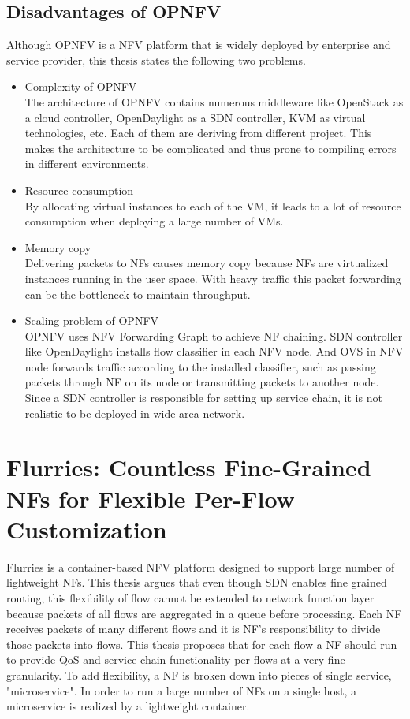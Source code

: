 \subsection{Disadvantages of OPNFV}
Although OPNFV is a NFV platform that is widely deployed by enterprise and service provider, this thesis states the following two problems.
\begin{itemize}
	\item Complexity of OPNFV \\
		The architecture of OPNFV contains numerous middleware like OpenStack as a cloud controller, OpenDaylight as a SDN controller, KVM as virtual technologies, etc. Each of them are deriving from different project. This makes the architecture to be complicated and thus prone to compiling errors in different environments. 
	\item Resource consumption \\
		By allocating virtual instances to each of the VM, it leads to a lot of resource consumption when deploying a large number of VMs. 
	\item Memory copy \\
		Delivering packets to NFs causes memory copy because NFs are virtualized instances running in the user space. With heavy traffic this packet forwarding can be the bottleneck to maintain throughput. 
	\item Scaling problem of OPNFV \\
		OPNFV uses NFV Forwarding Graph to achieve NF chaining. SDN controller like OpenDaylight installs flow classifier in each NFV node. And OVS in NFV node forwards traffic according to the installed classifier, such as passing packets through NF on its node or transmitting packets to another node. Since a SDN controller is responsible for setting up service chain, it is not realistic to be deployed in wide area network. 
\end{itemize}

\section{Flurries: Countless Fine-Grained NFs for Flexible Per-Flow Customization} 
Flurries\cite{flurries} is a container-based NFV platform designed to support large number of lightweight NFs. This thesis argues that even though SDN enables fine grained routing, this flexibility of flow cannot be extended to network function layer because packets of all flows are aggregated in a queue before processing. Each NF receives packets of many different flows and it is NF's responsibility to divide those packets into flows. This thesis proposes that for each flow a NF should run to provide QoS and service chain functionality per flows at a very fine granularity. To add flexibility, a NF is broken down into pieces of single service, "microservice". In order to run a large number of NFs on a single host, a microservice is realized by a lightweight container. 

